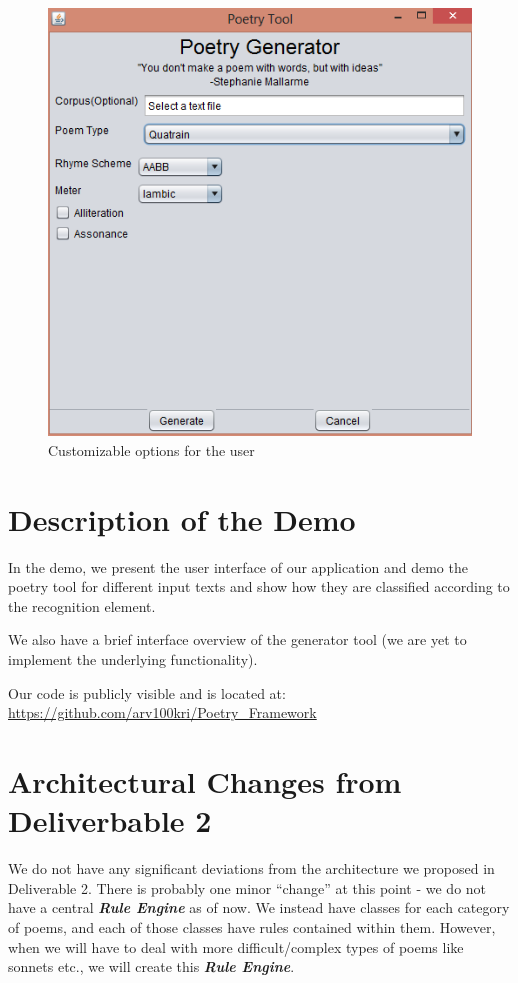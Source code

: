 \documentclass[10pt, letter]{article}
\begin{document}
\begin{figure}[ht]
  \centering
    \includegraphics[scale=0.5]{Images/screen4}
    \caption{Customizable options for the user}
  \label{screen5}
\end{figure}



\section*{Description of the Demo}
In the demo, we present the user interface of our application and demo the poetry tool for different input texts and show how they are classified according to the recognition element.

We also have a brief interface overview of the generator tool (we are yet to implement the underlying functionality).

Our code is publicly visible and is located at: \url{https://github.com/arv100kri/Poetry_Framework}

\section*{Architectural Changes from Deliverbable 2}

We do not have any significant deviations from the architecture we proposed in Deliverable 2. There is probably one minor “change” at this point - we do not have a central \textbf{\textit{Rule Engine}} as of now. We instead have classes for each category of poems, and each of those classes have rules contained within them. However, when we will have to deal with more difficult/complex types of poems like sonnets etc., we will create this \textbf{\textit{Rule Engine}}.
\end{document}
